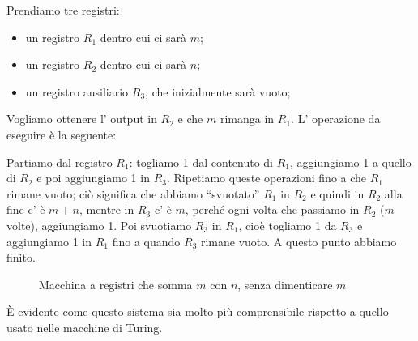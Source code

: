 \begin{esempio}
    Prendiamo tre registri:
    \begin{itemize}
    \item un registro \( R_1 \) dentro cui ci sar\`a \( m \);
    \item un registro \( R_2 \) dentro cui ci sar\`a \( n \);
    \item un registro ausiliario \( R_3 \), che inizialmente sar\`a vuoto;
    \end{itemize}
    Vogliamo ottenere l' output in \( R_2 \) e che \( m \) rimanga in
    \( R_1 \). L' operazione da eseguire \`e la seguente:

    Partiamo dal registro \( R_1 \): togliamo 1 dal contenuto di \(
    R_1 \), aggiungiamo 1 a quello di \( R_2 \) e poi aggiungiamo 1 in
    \( R_3 \). Ripetiamo queste operazioni fino a che \( R_1 \) rimane
    vuoto; ci\`o significa che abbiamo ``svuotato'' \( R_1 \) in \(
    R_2 \) e quindi in \( R_2 \) alla fine c' \`e \( m+n \), mentre in
    \( R_3 \) c' \`e \( m \), perch\'e ogni volta che passiamo in \(
    R_2 \) (\( m \) volte), aggiungiamo 1. Poi svuotiamo \( R_3 \) in
    \( R_1 \), cio\`e togliamo 1 da \( R_3 \) e aggiungiamo 1 in \(
    R_1 \) fino a quando \( R_3 \) rimane vuoto. A questo punto
    abbiamo finito.

    \begin{figure}[hbtp]
    \hspace{0cm}
    \caption{Macchina a registri che somma \( m \) con \( n \), senza dimenticare \( m \)}
    \end{figure}

\end{esempio}

\`E evidente come questo sistema sia molto pi\`u comprensibile rispetto a quello usato nelle macchine di Turing.

